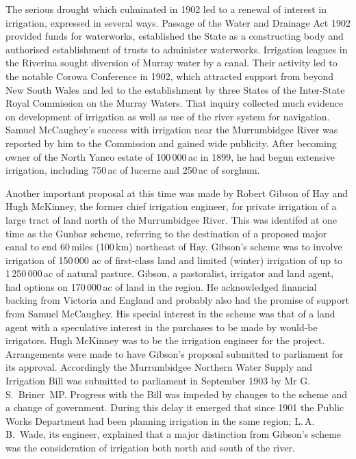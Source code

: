 The serious drought which culminated in 1902 led to a renewal of
interest in irrigation, expressed in several ways.  Passage of the
Water and Drainage Act 1902 provided funds for waterworks, established
the State as a constructing body and authorised establishment of
trusts to administer waterworks.
Irrigation leagues in the Riverina sought diversion of Murray water by
a canal.  Their activity led to the notable Corowa Conference in 1902,
which attracted support from beyond New South Wales and led to the
establishment by three States of the Inter-State Royal Commission on
the Murray Waters.  That inquiry collected much evidence on
development of irrigation as well as use of the river system for
navigation.  Samuel McCaughey's success
with irrigation near the Murrumbidgee River was reported by him to the
Commission and gained wide publicity. After becoming owner of the
North Yanco estate of 100\,000\,ac in 1899, he had begun extensive
irrigation, including 750\,ac of lucerne and 250\,ac of
sorghum.

Another important proposal at this time was made by Robert Gibson of
Hay and Hugh McKinney, the former chief irrigation engineer, for
private irrigation of a large tract of land north of the Murrumbidgee
River.  This was identifed at one time as the Gunbar scheme, referring
to the destination of a proposed major canal to end 60\,miles
(100\,km) northeast of Hay.  Gibson's scheme was to involve irrigation
of 150\,000 ac of first-class land and limited (winter) irrigation of
up to 1\,250\,000\,ac of natural pasture.  Gibson, a pastoralist, irrigator and land
agent, had options on 170\,000\,ac of land in the region.  He acknowledged financial backing from Victoria and
England and probably also had the promise of support from Samuel
McCaughey.  His
special interest in the scheme was that of a land agent with a
speculative interest in the purchases to be made by would-be
irrigators.  Hugh McKinney was to be the irrigation engineer for the
project.  Arrangements were made to have Gibson's proposal submitted
to parliament for its approval.  Accordingly the Murrumbidgee Northern
Water Supply and Irrigation Bill was submitted to parliament in
September 1903 by Mr G.\,S.~Briner~MP.  Progress with the Bill was
impeded by changes to the scheme and a change of government. During
this delay it emerged that since 1901 the Public Works Department had
been planning irrigation in the same region; L.\,A.\,B.~Wade, its
engineer, explained that a major distinction from Gibson's scheme was
the consideration of irrigation both north and south of the
river.

